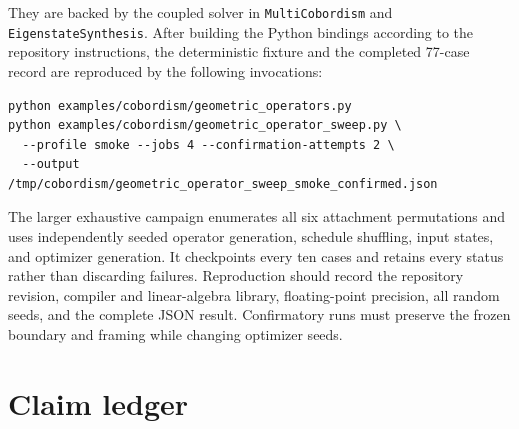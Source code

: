 \documentclass[11pt]{article}
\numberwithin{equation}{section}
\theoremstyle{definition}
\theoremstyle{remark}
\begin{document}
They are backed by the coupled solver in \texttt{MultiCobordism} and
\texttt{EigenstateSynthesis}.  After building the Python bindings according to
the repository instructions, the deterministic fixture and the completed
77-case record are reproduced by the following invocations:

\begin{verbatim}
python examples/cobordism/geometric_operators.py
python examples/cobordism/geometric_operator_sweep.py \
  --profile smoke --jobs 4 --confirmation-attempts 2 \
  --output /tmp/cobordism/geometric_operator_sweep_smoke_confirmed.json
\end{verbatim}

The larger exhaustive campaign enumerates all six attachment permutations and
uses independently seeded operator generation, schedule shuffling, input
states, and optimizer generation.  It checkpoints every ten cases and retains
every status rather than discarding failures.  Reproduction should record the
repository revision, compiler and linear-algebra library, floating-point
precision, all random seeds, and the complete JSON result.  Confirmatory runs
must preserve the frozen boundary and framing while changing optimizer seeds.

\section{Claim ledger}
\end{document}
